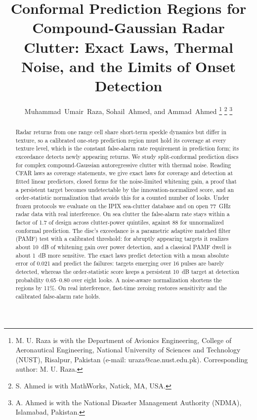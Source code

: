 \documentclass[journal]{IEEEtran}
\begin{document}
\title{Conformal Prediction Regions for Compound-Gaussian Radar Clutter: Exact Laws, Thermal Noise, and the Limits of Onset Detection}

\author{Muhammad~Umair~Raza, Sohail~Ahmed, and Ammad~Ahmed%
\thanks{M. U. Raza is with the Department of Avionics Engineering, College of Aeronautical Engineering, National University of Sciences and Technology (NUST), Risalpur, Pakistan (e-mail: uraza@cae.nust.edu.pk). Corresponding author: M. U. Raza.}%
\thanks{S. Ahmed is with MathWorks, Natick, MA, USA.}%
\thanks{A. Ahmed is with the National Disaster Management Authority (NDMA), Islamabad, Pakistan.}}

\maketitle

\begin{abstract}
Radar returns from one range cell share short-term speckle dynamics but differ in texture, so a calibrated one-step prediction region must hold its coverage at every texture level, which is the constant false-alarm rate requirement in prediction form; its exceedance detects newly appearing returns. We study split-conformal prediction discs for complex compound-Gaussian autoregressive clutter with thermal noise. Reading CFAR laws as coverage statements, we give exact laws for coverage and detection at fitted linear predictors, closed forms for the noise-limited whitening gain, a proof that a persistent target becomes undetectable by the innovation-normalized score, and an order-statistic normalization that avoids this for a counted number of looks. Under frozen protocols we evaluate on the IPIX sea-clutter database and on open 77~GHz radar data with real interference. On sea clutter the false-alarm rate stays within a factor of 1.7 of design across clutter-power quintiles, against 88 for unnormalized conformal prediction. The disc's exceedance is a parametric adaptive matched filter (PAMF) test with a calibrated threshold: for abruptly appearing targets it realizes about 10~dB of whitening gain over power detection, and a classical PAMF dwell is about 1~dB more sensitive. The exact laws predict detection with a mean absolute error of 0.021 and predict the failures: targets emerging over 16 pulses are barely detected, whereas the order-statistic score keeps a persistent 10~dB target at detection probability 0.65--0.80 over eight looks. A noise-aware normalization shortens the regions by 11\%. On real interference, fast-time zeroing restores sensitivity and the calibrated false-alarm rate holds.
\end{abstract}
\end{document}

